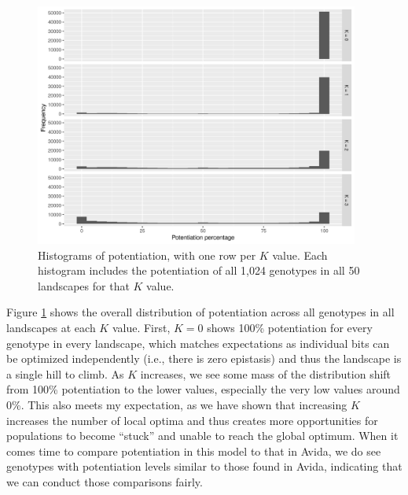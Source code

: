 \begin{figure}[h!]
    \centering
    \includegraphics[width=0.95\textwidth]{04_simplified_model/media/success_histogram.png}
    \caption{
        Histograms of potentiation, with one row per $K$ value.
        Each histogram includes the potentiation of all 1,024 genotypes in all 50 landscapes for that $K$ value.
    }
    \label{fig:simplified_model:potentaition_histogram}
\end{figure}

Figure \ref{fig:simplified_model:potentaition_histogram} shows the overall distribution of potentiation across all genotypes in all landscapes at each $K$ value. 
First, $K=0$ shows 100\% potentiation for every genotype in every landscape, which matches expectations as individual bits can be optimized independently (i.e., there is zero epistasis) and thus the landscape is a single hill to climb. 
As $K$ increases, we see some mass of the distribution shift from 100\% potentiation to the lower values, especially the very low values around 0\%. 
This also meets my expectation, as we have shown that increasing $K$ increases the number of local optima and thus creates more opportunities for populations to become ``stuck'' and unable to reach the global optimum. 
When it comes time to compare potentiation in this model to that in Avida, we do see genotypes with potentiation levels similar to those found in Avida, indicating that we can conduct those comparisons fairly. 


